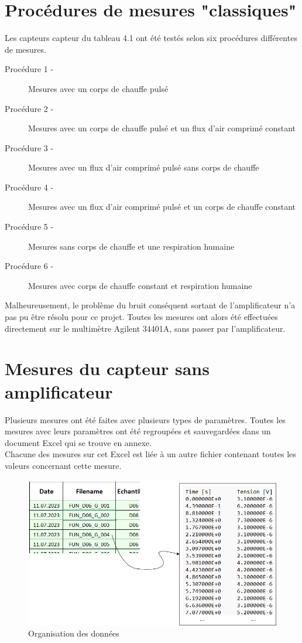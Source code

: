 \section{Procédures de mesures "classiques"}
Les capteurs \gls{capteur} du tableau 4.1 ont été testés selon six procédures différentes de mesures.\\
\begin{description}
    \item[Procédure 1 -] Mesures avec un corps de chauffe pulsé\\
    \item[Procédure 2 -] Mesures avec un corps de chauffe pulsé et un flux d'air comprimé constant\\
    \item[Procédure 3 -] Mesures avec un flux d'air comprimé pulsé sans corps de chauffe\\
    \item[Procédure 4 -] Mesures avec un flux d'air comprimé pulsé et un corps de chauffe constant\\
    \item[Procédure 5 -] Mesures sans corps de chauffe et une respiration humaine\\
    \item[Procédure 6 -] Mesures avec corps de chauffe constant et respiration humaine
\end{description}

Malheureusement, le problème du bruit conséquent sortant de l'amplificateur n'a pas pu être résolu pour ce projet. Toutes les mesures ont alors 
été effectuées directement sur le multimètre Agilent 34401A, sans passer par l'amplificateur. 

\section{Mesures du capteur sans amplificateur}
Plusieurs mesures ont été faites avec plusieurs types de paramètres. Toutes les mesures avec leurs paramètres ont été regroupées et sauvegardées
dans un document Excel qui se trouve en annexe.\\
Chacune des mesures sur cet Excel est liée à un autre fichier contenant toutes les valeurs concernant cette mesure.
\begin{figure}[H]
    \centering
    \includegraphics[scale = 0.4]{assets/figures/Data.png}
    \caption{Organisation des données}
    \label{fig:data_orga}
\end{figure}


